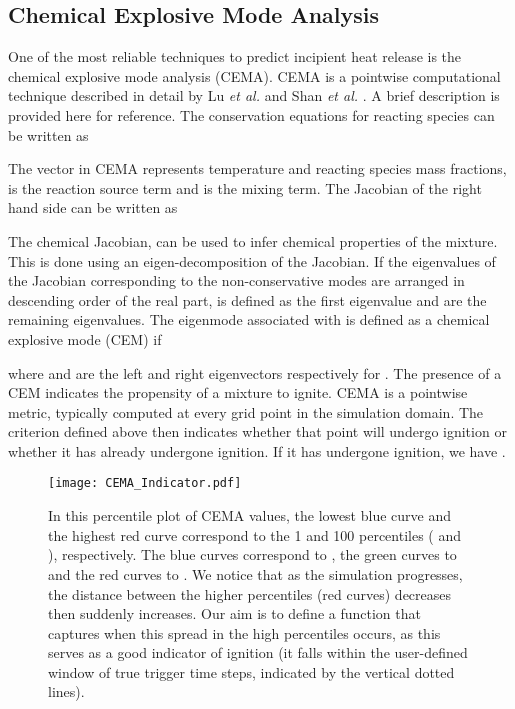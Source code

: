 \documentclass[final]{siamltex}
\begin{document}
\subsection{Chemical Explosive Mode Analysis}
\label{sec:intution}
One of the most reliable techniques to predict incipient heat release is
the chemical explosive mode analysis (CEMA).
CEMA is a pointwise computational technique described in detail by Lu \emph{et al.} \cite{lu} and Shan \emph{et al.}
\cite{shan}. A brief description is provided here for reference.
The conservation equations for reacting species can be written as 



\noindent The vector  in CEMA represents temperature and reacting
species mass fractions,  is the reaction source term and
 is the mixing term. The Jacobian of the right hand side can be written as 



\noindent The chemical Jacobian,  can be used to infer
chemical properties of the mixture. This is done using an
eigen-decomposition of the Jacobian. If the eigenvalues of the Jacobian
corresponding to the non-conservative modes are arranged in descending
order of the real part,  is defined as the first eigenvalue and
 are the remaining eigenvalues. The eigenmode associated with
 is defined as a chemical explosive mode (CEM) if 

   

\noindent where  and  are the left and right
eigenvectors respectively for . The presence of a CEM indicates
the propensity of a mixture to ignite. CEMA is a pointwise metric, typically
computed at every grid point in the simulation domain. The criterion
defined above then indicates whether that point will undergo ignition or
whether it has already undergone ignition. If it has undergone ignition, we
have .  

\begin{figure}[H]
\centering
\texttt{[image: CEMA\_Indicator.pdf]}
\caption{\label{fig:CEMA_indicator} 
   In this percentile plot of CEMA values, the lowest
blue curve and the highest red curve correspond to the 1 and
100 percentiles ( and ), respectively. The blue curves
correspond to , the green curves to 
and the red curves to . We notice that as the simulation progresses, the distance between the higher percentiles (red
curves) decreases then suddenly increases. Our aim is to define a 
function that captures when this spread in the high percentiles occurs, as this
serves as a good indicator of ignition (it falls within the user-defined window
of true trigger time steps, indicated by the vertical dotted lines).
}
\end{figure}
\end{document}
